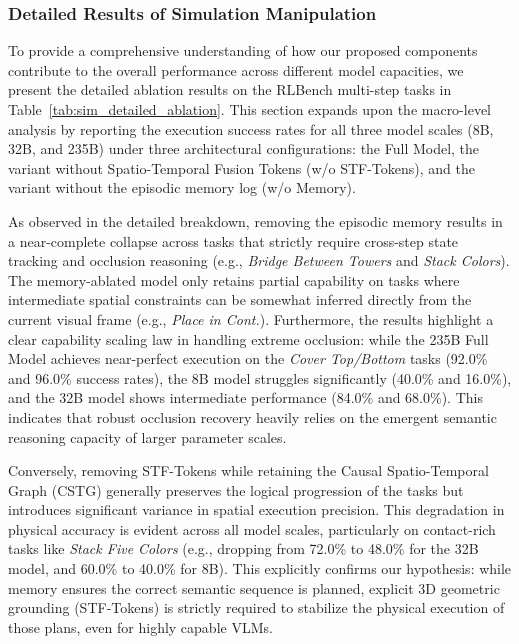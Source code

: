 \subsubsection{Detailed Results of Simulation Manipulation}

To provide a comprehensive understanding of how our proposed components contribute to the overall performance across different model capacities, we present the detailed ablation results on the RLBench multi-step tasks in Table~\ref{tab:sim_detailed_ablation}. This section expands upon the macro-level analysis by reporting the execution success rates for all three model scales (8B, 32B, and 235B) under three architectural configurations: the Full Model, the variant without Spatio-Temporal Fusion Tokens (w/o STF-Tokens), and the variant without the episodic memory log (w/o Memory).

As observed in the detailed breakdown, removing the episodic memory results in a near-complete collapse across tasks that strictly require cross-step state tracking and occlusion reasoning (e.g., \textit{Bridge Between Towers} and \textit{Stack Colors}). The memory-ablated model only retains partial capability on tasks where intermediate spatial constraints can be somewhat inferred directly from the current visual frame (e.g., \textit{Place in Cont.}). Furthermore, the results highlight a clear capability scaling law in handling extreme occlusion: while the 235B Full Model achieves near-perfect execution on the \textit{Cover Top/Bottom} tasks (92.0\% and 96.0\% success rates), the 8B model struggles significantly (40.0\% and 16.0\%), and the 32B model shows intermediate performance (84.0\% and 68.0\%). This indicates that robust occlusion recovery heavily relies on the emergent semantic reasoning capacity of larger parameter scales.

Conversely, removing STF-Tokens while retaining the Causal Spatio-Temporal Graph (CSTG) generally preserves the logical progression of the tasks but introduces significant variance in spatial execution precision. This degradation in physical accuracy is evident across all model scales, particularly on contact-rich tasks like \textit{Stack Five Colors} (e.g., dropping from 72.0\% to 48.0\% for the 32B model, and 60.0\% to 40.0\% for 8B). This explicitly confirms our hypothesis: while memory ensures the correct semantic sequence is planned, explicit 3D geometric grounding (STF-Tokens) is strictly required to stabilize the physical execution of those plans, even for highly capable VLMs.

